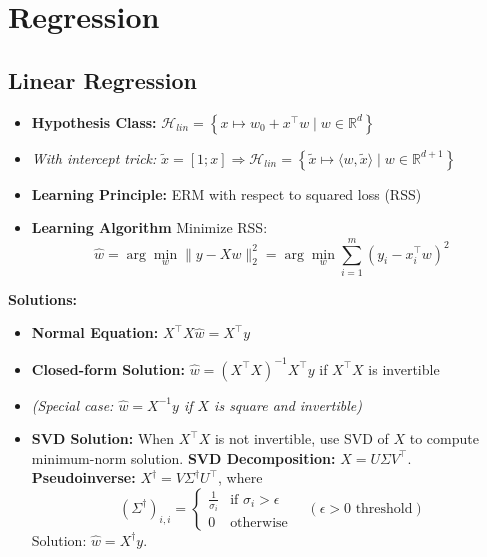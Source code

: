 \section{Regression}

\subsection{Linear Regression}
\begin{itemize}
    \item \textbf{Hypothesis Class:} $\mathcal{H}_\mathit{lin} = \left\{ x \mapsto w_0 + x^\top w \mid w \in \mathbb{R}^d \right\}$
    \item[] \textit{With intercept trick: } $\tilde{x} = [1; x] \Rightarrow \mathcal{H}_\mathit{lin} = \left\{ \tilde{x} \mapsto \langle w, \tilde{x} \rangle \mid w \in \mathbb{R}^{d+1} \right\}$
    \item \textbf{Learning Principle:} ERM with respect to squared loss (RSS)
    \item \textbf{Learning Algorithm} Minimize RSS:
          \vspace{-0.7em}
          \[ \hat{w} = \arg\min_w \|y - Xw\|_2^2 = \arg\min_w \sum_{i=1}^m (y_i - x_i^\top w)^2 \]
          \vspace{-0.8em}
\end{itemize}

\textbf{Solutions:}
\begin{itemize}
    \item \textbf{Normal Equation:} $X^\top X \hat{w} = X^\top y$
    \item \textbf{Closed-form Solution:} $\hat{w} = (X^\top X)^{-1} X^\top y$ \quad if $X^\top X$ is invertible
    \item[] \textit{(Special case: $\hat{w} = X^{-1} y$ if $X$ is square and invertible)}
    \item \textbf{SVD Solution:} When $X^\top X$ is not invertible, use SVD of $X$ to compute minimum-norm solution.
          \textbf{SVD Decomposition:} $X = U \Sigma V^\top$.
          \textbf{Pseudoinverse:} $X^\dagger = V \Sigma^\dagger U^\top$, where
          \[
              (\Sigma^\dagger)_{i,i} =
              \begin{cases}
                  \frac{1}{\sigma_i} & \text{if } \sigma_i > \epsilon \\
                  0                  & \text{otherwise}
              \end{cases}
              \quad (\epsilon > 0 \text{ threshold})
          \]
          Solution: $\hat{w} = X^\dagger y$.
\end{itemize}

